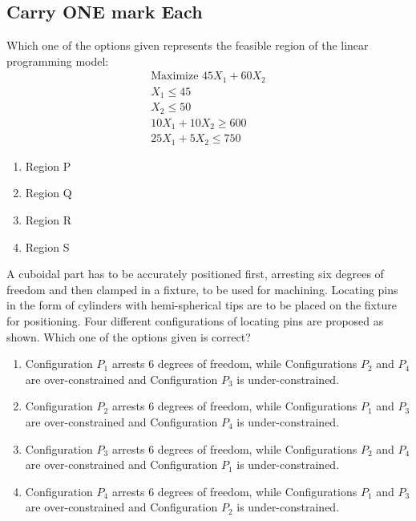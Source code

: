 \iffalse
\author{EE24BTECH11049}
\section{me}
\chapter{2023}
\fi

\subsection{Carry ONE mark Each}
    \item 
    Which one of the options given represents the feasible region of the linear programming model:
    \begin{align*}
        \text{Maximize } 45X_1 + 60X_2\\
        X_1 \leq 45\\
        X_2 \leq 50 \\
        10X_1 + 10X_2 \geq 600\\
        25X_1 + 5X_2 \leq 750 
    \end{align*}


    \begin{enumerate}
        \item Region P
        \item Region Q
        \item Region R
        \item Region S
    \end{enumerate}

    \item 
    A cuboidal part has to be accurately positioned first, arresting six degrees of freedom and then clamped in a fixture, to be used for machining. Locating pins in the form of cylinders with hemi-spherical tips are to be placed on the fixture for positioning. Four different configurations of locating pins are proposed as shown. Which one of the options given is correct?


    \begin{enumerate}
        \item Configuration $P_1$ arrests 6 degrees of freedom, while Configurations $P_2$ and $P_4$ are over-constrained and Configuration $P_3$ is under-constrained.
        \item Configuration $P_2$ arrests 6 degrees of freedom, while Configurations $P_1$ and $P_3$ are over-constrained and Configuration $P_4$ is under-constrained.
        \item Configuration $P_3$ arrests 6 degrees of freedom, while Configurations $P_2$ and $P_4$ are over-constrained and Configuration $P_1$ is under-constrained.
        \item Configuration $P_4$ arrests 6 degrees of freedom, while Configurations $P_1$ and $P_3$ are over-constrained and Configuration $P_2$ is under-constrained.
    \end{enumerate}

